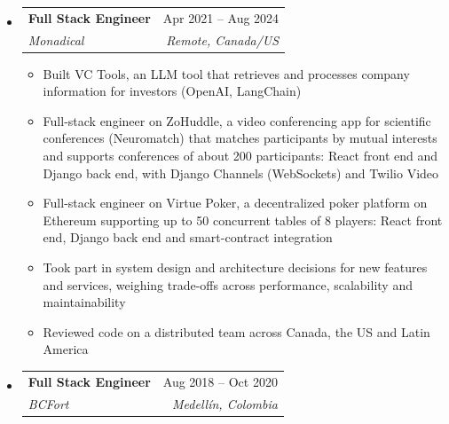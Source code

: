 \documentclass[letterpaper,10pt]{article}
\makeatletter
\newcommand{\resumeSubheading}[4]{
  \vspace{-2pt}
  \item[]
  \begin{tabular*}{\textwidth}{@{\extracolsep{\fill}}l r}
    \textbf{#1} & #2 \\
    \textit{#3} & \textit{#4} \\
  \end{tabular*}
  \vspace{-5pt}
}
\makeatother
\begin{document}
\begin{itemize}[leftmargin=0pt, itemindent=0pt, label={}, itemsep=1pt]
\begin{itemize}[leftmargin=*, itemsep=0pt]
    \item Lead engineer of CREARIA's multi-tenant AI support agent on WhatsApp, email and Instagram, in production with several client businesses including a real-estate agency. Support went from an 8-hour human shift to 24/7 and average response time from 15--20 minutes to seconds. Led a team of three across 5 FastAPI services and 2 Next.js dashboards on AWS ECS with Terraform, RAG over pgvector, 11 MCP tools scoped per tenant, LiteLLM fallback routing, ARQ (Redis) workers for email, Meta messaging and agent orchestration, and human escalation; load-tested to 250 virtual users. Also designed the architecture of an AI coaching agent for one of CREARIA's clients
    \item Designed database architecture for a client's workflow automation platform and served as code reviewer for their development team
    \item Ran technical design sessions with clients, translating business requirements into system architectures and naming the trade-off behind each technology decision
\end{itemize}
\resumeSubheading
{Full Stack Engineer}{Apr 2021 -- Aug 2024}
{Monadical}{Remote, Canada/US}
\begin{itemize}[leftmargin=*, itemsep=0pt]
    \item Built VC Tools, an LLM tool that retrieves and processes company information for investors (OpenAI, LangChain)
    \item Full-stack engineer on ZoHuddle, a video conferencing app for scientific conferences (Neuromatch) that matches participants by mutual interests and supports conferences of about 200 participants: React front end and Django back end, with Django Channels (WebSockets) and Twilio Video
    \item Full-stack engineer on Virtue Poker, a decentralized poker platform on Ethereum supporting up to 50 concurrent tables of 8 players: React front end, Django back end and smart-contract integration
    \item Took part in system design and architecture decisions for new features and services, weighing trade-offs across performance, scalability and maintainability
    \item Reviewed code on a distributed team across Canada, the US and Latin America
\end{itemize}
\resumeSubheading
{Full Stack Engineer}{Aug 2018 -- Oct 2020}
{BCFort}{Medell\'in, Colombia}
\begin{itemize}[leftmargin=*, itemsep=0pt]

\end{itemize}
\end{itemize}
\end{document}
